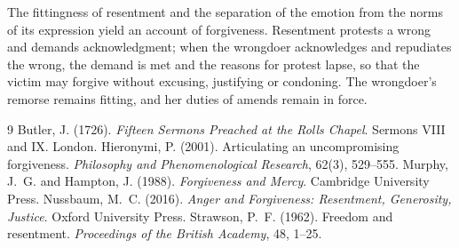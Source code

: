 \documentclass{situationist-preprint}
\begin{document}
The fittingness of resentment and the separation of the emotion from the norms of its expression yield an account of forgiveness. Resentment protests a wrong and demands acknowledgment; when the wrongdoer acknowledges and repudiates the wrong, the demand is met and the reasons for protest lapse, so that the victim may forgive without excusing, justifying or condoning. The wrongdoer's remorse remains fitting, and her duties of amends remain in force.

\begin{thebibliography}{9}\small
{} Butler, J. (1726). \emph{Fifteen Sermons Preached at the Rolls Chapel}. Sermons VIII and IX. London.
 Hieronymi, P. (2001). Articulating an uncompromising forgiveness. \emph{Philosophy and Phenomenological Research}, 62(3), 529--555.
 Murphy, J.~G. and Hampton, J. (1988). \emph{Forgiveness and Mercy}. Cambridge University Press.
 Nussbaum, M.~C. (2016). \emph{Anger and Forgiveness: Resentment, Generosity, Justice}. Oxford University Press.
 Strawson, P.~F. (1962). Freedom and resentment. \emph{Proceedings of the British Academy}, 48, 1--25.
\end{thebibliography}
\end{document}
